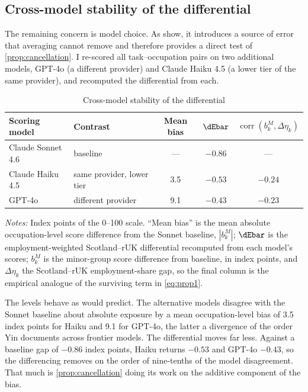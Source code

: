 \subsection{Cross-model stability of the differential}\label{sec:crossmodel}
 
The remaining concern is model choice. As \citet{yin2026} show, it introduces a source of error that averaging cannot remove and therefore provides a direct test of \cref{prop:cancellation}. I re-scored all task--occupation pairs on two additional models, GPT-4o (a different provider) and Claude Haiku 4.5 (a lower tier of the same provider), and recomputed the differential from each.
 
\begin{table}[t]
\centering
\caption{Cross-model stability of the differential}
\label{tab:crossmodel}
\small
\begin{tabular}{llccc}
\toprule
Scoring model & Contrast & Mean bias & $\dEbar$ &
$\operatorname{corr}(b^{M}_k, \Delta\eta_k)$ \\
\midrule
Claude Sonnet 4.6 & baseline                   & --- & $-0.86$ & --- \\
Claude Haiku 4.5  & same provider, lower tier  & 3.5 & $-0.53$ & $-0.24$ \\
GPT-4o            & different provider         & 9.1 & $-0.43$ & $-0.23$ \\
\bottomrule
\end{tabular}
\begin{minipage}{0.92\textwidth}
\vspace{0.4em}\footnotesize
\textit{Notes:} Index points of the 0--100 scale. ``Mean bias'' is the mean absolute occupation-level score difference from the Sonnet baseline, $|b^{M}_k|$; $\dEbar$ is the employment-weighted Scotland--rUK differential recomputed from each model's scores; $b^{M}_k$ is the minor-group score difference from baseline, in index points, and $\Delta\eta_k$ the Scotland--rUK employment-share gap, so the final column is the empirical analogue of the surviving term in \cref{eq:prop1}.
\end{minipage}
\end{table}
 
The levels behave as \citet{yin2026} would predict. The alternative models disagree with the Sonnet baseline about absolute exposure by a mean occupation-level bias of 3.5 index points for Haiku and 9.1 for GPT-4o, the latter a divergence of the order Yin documents across frontier models. The differential moves far less. Against a baseline gap of $-0.86$ index points, Haiku returns $-0.53$ and GPT-4o $-0.43$, so the differencing removes on the order of nine-tenths of the model disagreement. That much is \cref{prop:cancellation} doing its work on the additive component of the bias.
 
